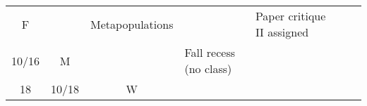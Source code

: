 \documentclass[]{article}
\begin{document}
\begin{longtable}[]{@{}cccllll@{}}
\begin{minipage}[t]{0.07\columnwidth}
F\strut
\end{minipage} & \begin{minipage}[t]{0.10\columnwidth}\raggedright\strut
\strut
\end{minipage} & \begin{minipage}[t]{0.11\columnwidth}\raggedright\strut
Metapopulations\strut
\end{minipage} & \begin{minipage}[t]{0.11\columnwidth}\raggedright\strut
\strut
\end{minipage} & \begin{minipage}[t]{0.16\columnwidth}\raggedright\strut
Paper critique II assigned\strut
\end{minipage}\tabularnewline
\begin{minipage}[t]{0.12\columnwidth}\centering\strut
10/16\strut
\end{minipage} & \begin{minipage}[t]{0.08\columnwidth}\centering\strut
M\strut
\end{minipage} & \begin{minipage}[t]{0.07\columnwidth}\centering\strut
\strut
\end{minipage} & \begin{minipage}[t]{0.10\columnwidth}\raggedright\strut
Fall recess (no class)\strut
\end{minipage} & \begin{minipage}[t]{0.11\columnwidth}\raggedright\strut
\strut
\end{minipage} & \begin{minipage}[t]{0.11\columnwidth}\raggedright\strut
\strut
\end{minipage} & \begin{minipage}[t]{0.16\columnwidth}\raggedright\strut
\strut
\end{minipage}\tabularnewline
\begin{minipage}[t]{0.12\columnwidth}\centering\strut
18\strut
\end{minipage} & \begin{minipage}[t]{0.08\columnwidth}\centering\strut
10/18\strut
\end{minipage} & \begin{minipage}[t]{0.07\columnwidth}\centering\strut
W\strut
\end{minipage} & \begin{minipage}[t]{0.10\columnwidth}\raggedright\strut
\strut
\end{minipage} & \begin{minipage}[t]{0.11\columnwidth}\raggedright\strut

\end{minipage}
\end{longtable}
\end{document}
